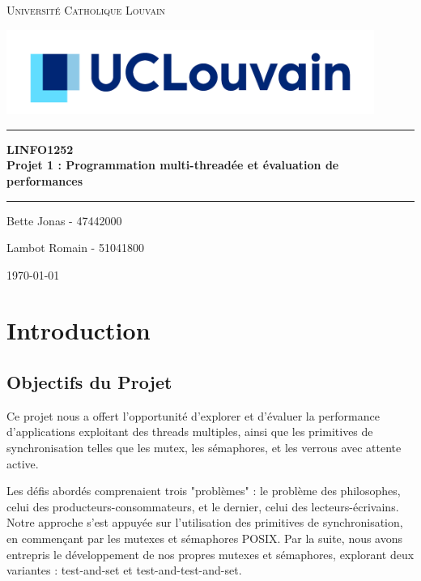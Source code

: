 \documentclass[12pt,titlepage]{article}
\begin{document}
\begin{titlepage}

\newcommand{\HRule}{\rule{\linewidth}{0.5mm}}
\center

\textsc{
    \LARGE Université Catholique Louvain
}

\hspace{1cm}

\includegraphics[width=0.9\textwidth, keepaspectratio]{uclougo.jpg}

\hspace{1cm}

\HRule \hspace{4cm}

{ 
    \huge \bfseries LINFO1252 \\ Projet 1 : Programmation multi-threadée et évaluation de performances \hspace{0.15cm}
}
\HRule \hspace{1.5cm}

\center

Bette Jonas - 47442000

Lambot Romain - 51041800

\hspace{1cm}

\today \hspace{1cm}
\end{titlepage}

\section{Introduction}

\subsection{Objectifs du Projet}

Ce projet nous a offert l'opportunité d'explorer et d'évaluer la performance d'applications exploitant des threads multiples, ainsi que les primitives de synchronisation telles que les mutex, les sémaphores, et les verrous avec attente active.

Les défis abordés comprenaient trois "problèmes" : le problème des philosophes, celui des producteurs-consommateurs, et le dernier, celui des lecteurs-écrivains. Notre approche s'est appuyée sur l'utilisation des primitives de synchronisation, en commençant par les mutexes et sémaphores POSIX. Par la suite, nous avons entrepris le développement de nos propres mutexes et sémaphores, explorant deux variantes : test-and-set et test-and-test-and-set.
\end{document}
